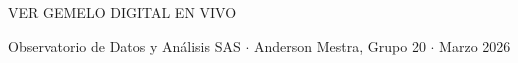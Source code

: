 \documentclass[aspectratio=169, 10pt]{beamer}
\begin{document}
\begin{frame}
\vspace{6pt}
\begin{center}
\colorbox{verde}{\normalsize\bfseries\color{white}\strut\hspace{8pt}VER GEMELO DIGITAL EN VIVO\hspace{8pt}}
\vspace{2pt}

{\tiny\color{gris} Observatorio de Datos y An\'alisis SAS $\cdot$ Anderson Mestra, Grupo 20 $\cdot$ Marzo 2026}
\end{center}
\end{frame}
\end{document}
